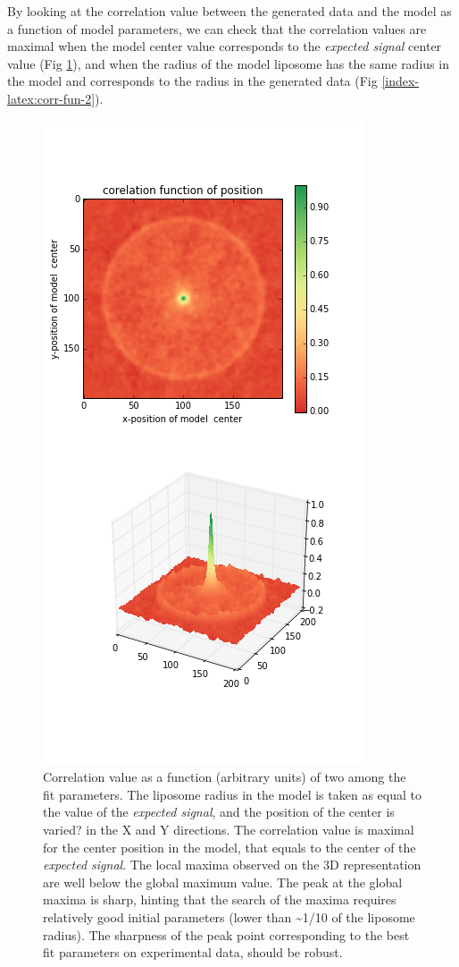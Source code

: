 \documentclass[A4paperpaper,11pt,english]{sphinxmanual}
\begin{document}
By looking at the correlation value between the generated data and the model
as a function of model parameters, we can check that the correlation
values are maximal when the model center value corresponds to the \emph{expected signal}
center value (Fig \ref{index-latex:corr-fun-1}), and when the radius of the model liposome
has the same radius in the model and corresponds to the radius in the generated data (Fig \ref{index-latex:corr-fun-2}).
\begin{figure}[htbp]
\centering
\capstart

\includegraphics[width=0.500\linewidth]{double-c-_100-by-100-rc-40_0-noise-0_5-delta-4_0_.png}
\caption{Correlation value as a function (arbitrary units) of two among the fit
parameters. The liposome radius in the model is taken as
equal to the value of the \emph{expected signal}, and the position of the center
is varied?  in the X and Y directions. The correlation value is maximal for
the center position in the model, that equals to the center of the
\emph{expected signal}.  The local maxima observed on the 3D representation
are well below the global maximum value.
The peak at the global maxima is sharp, hinting that
the search of the maxima requires relatively good initial
parameters (lower than \textasciitilde{}1/10 of the liposome radius). The sharpness of the peak
point corresponding to the best fit parameters on experimental data, should be
robust.}\label{index-latex:corr-fun-1}\end{figure}
\end{document}
